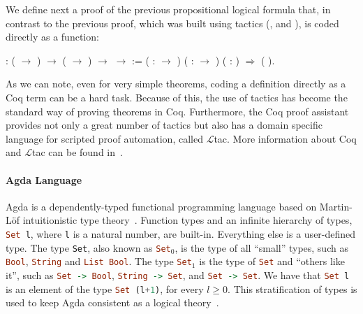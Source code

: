 We define next a proof of the previous propositional logical formula
that, in contrast to the previous proof, which was built using tactics
(,  and ), is coded
directly as a function:
 \begin{coqdoccode}
\coqdocemptyline
\coqdocnoindent
{} \coqdoceol
\coqdocindent{1.00em}
: ( \ensuremath{\rightarrow} ) \ensuremath{\rightarrow} ( \ensuremath{\rightarrow} ) \ensuremath{\rightarrow}  \ensuremath{\rightarrow}  :=\coqdoceol
\coqdocindent{1.50em}
 ( :  \ensuremath{\rightarrow} ) ( :  \ensuremath{\rightarrow} ) ( : ) \ensuremath{\Rightarrow}  ( ).\coqdoceol
\coqdocemptyline
\end{coqdoccode}
As we can note, even for very simple theorems, coding a definition directly
as a Coq term can be a hard task. Because of this, the use of tactics
has become the standard way of proving theorems in Coq. Furthermore,
the Coq proof assistant provides not only a great number of tactics
but also has a domain specific language for scripted proof automation,
called $\mathcal{L}$tac. More information about Coq and  $\mathcal{L}$tac can be found
in~\cite{Chlipala13,Bertot04}.


\paragraph{Agda Language}
Agda is a dependently-typed functional programming language based on
Martin-L\"of intuitionistic type theory~\cite{Lof98}.  Function types
and an infinite hierarchy of types, \lstinline[language=haskell]|Set l|, where \lstinline|l| is a
natural number, are built-in. Everything else is a user-defined
type. The type \lstinline|Set|, also known as \lstinline[language=haskell]|Set|$_0$, is the type of all
``small'' types, such as \lstinline[language=haskell]|Bool|, \lstinline[language=haskell]|String| and
 \lstinline[language=haskell]|List Bool|.  The type \lstinline[language=haskell]|Set|$_1$ is the type
of \lstinline[language=haskell]|Set|
and ``others like it'', such as \lstinline[language=haskell]|Set -> Bool|,
\lstinline[language=haskell]|String -> Set|, and \lstinline[language=haskell]|Set -> Set|.
We have that \lstinline[language=haskell]|Set l| is an
element of the type \lstinline[language=haskell]|Set (l+1)|, for every $l \geq 0$. This
stratification of types is used to keep Agda consistent as a logical
theory~\cite{Sorensen06}.


